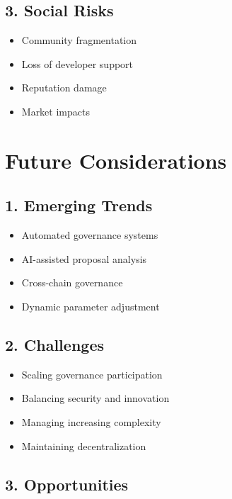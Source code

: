 \documentclass[
  letterpaper,
  DIV=11,
  numbers=noendperiod]{scrreprt}
\providecommand{\tightlist}{%
  \setlength{\itemsep}{0pt}\setlength{\parskip}{0pt}}\usepackage{longtable,booktabs,array}
\begin{document}
\subsection{3. Social Risks}\label{social-risks}

\begin{itemize}
\tightlist
\item
  Community fragmentation
\item
  Loss of developer support
\item
  Reputation damage
\item
  Market impacts
\end{itemize}

\section{Future Considerations}\label{future-considerations}

\subsection{1. Emerging Trends}\label{emerging-trends}

\begin{itemize}
\tightlist
\item
  Automated governance systems
\item
  AI-assisted proposal analysis
\item
  Cross-chain governance
\item
  Dynamic parameter adjustment
\end{itemize}

\subsection{2. Challenges}\label{challenges}

\begin{itemize}
\tightlist
\item
  Scaling governance participation
\item
  Balancing security and innovation
\item
  Managing increasing complexity
\item
  Maintaining decentralization
\end{itemize}

\subsection{3. Opportunities}\label{opportunities}
\end{document}
